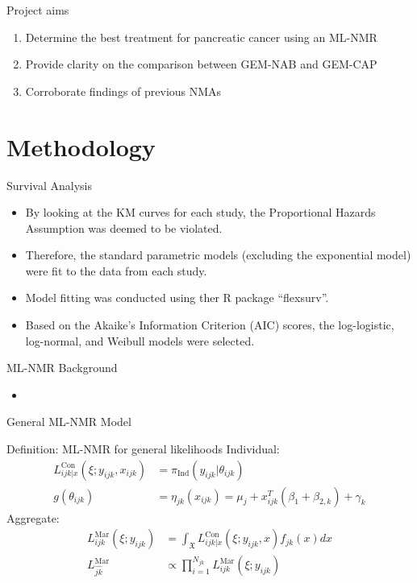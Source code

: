 \documentclass{beamer}
\begin{document}
\begin{frame}{Project aims}
    \begin{enumerate}
        \item Determine the best treatment for pancreatic cancer using an ML-NMR
        \pause
        \item Provide clarity on the comparison between GEM-NAB and GEM-CAP
        \pause
        \item Corroborate findings of previous NMAs
    \end{enumerate} 
\end{frame} 

\section{Methodology}

\begin{frame}{Survival Analysis}
    \begin{itemize}
        \item By looking at the KM curves for each study, the Proportional Hazards Assumption was deemed to be violated.
        \pause
        \item Therefore, the standard parametric models (excluding the exponential model) were fit to the data from each study.
        \pause
        \item Model fitting was conducted using ther R package ``flexsurv''.
        \pause
        \item Based on the Akaike's Information Criterion (AIC) scores, the log-logistic, log-normal, and Weibull models were selected. 
    \end{itemize}   
\end{frame} 

\begin{frame}{ML-NMR Background}
    \begin{itemize}
        \item 
    \end{itemize}
\end{frame}

\begin{frame}{General ML-NMR Model}
    \begin{block}{Definition: ML-NMR for general likelihoods}
    Individual:
    \begin{align}
        L_{ijk|x}^{\text{Con}}(\xi;y_{ijk},x_{ijk}) &= \pi_{\text{Ind}}(y_{ijk}|\theta_{ijk}) \\
        g(\theta_{ijk}) &= \eta_{jk}(x_{ijk}) = \mu_j + x_{ijk}^T(\beta_1 + \beta_{2,k}) + \gamma_k \label{mlnmragg}
    \end{align}
    Aggregate:
    \begin{align}
        L_{ijk}^{\text{Mar}}(\xi; y_{ijk}) &= \int_{\mathfrak{X}} L_{ijk|x}^{\text{Con}}(\xi; y_{ijk}, x)f_{jk}(x)dx \label{mlnnmrint}\\
        L_{\hat{jk}}^{\text{Mar}} &\propto \prod_{i = 1}^{N_{jk}}L_{ijk}^{\text{Mar}}(\xi; y_{ijk})
    \end{align}
    \end{block}
\end{frame}
\end{document}
